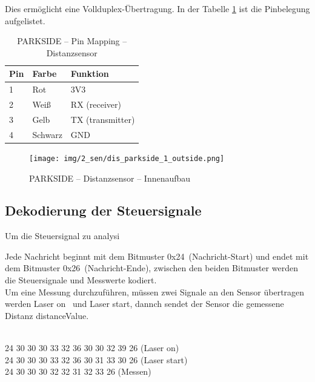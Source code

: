 Dies ermöglicht eine Vollduplex-Übertragung. In der Tabelle \ref{parkside:pinmapping} ist die Pinbelegung aufgelistet.\\



\pagebreak[1]
\begin{table}[ht]
	\centering
	\caption{PARKSIDE – Pin Mapping – Distanzsensor}
	\label{parkside:pinmapping}
	\begin{tabular}{l|ll}
		\hline
		\textbf{Pin} & \textbf{Farbe} & \textbf{Funktion} \\ \hline
		1            & Rot            & 3V3               \\
		2            & Weiß           & RX (receiver)     \\
		3            & Gelb           & TX (transmitter)  \\
		4            & Schwarz        & GND               \\ \hline
	\end{tabular}
\end{table}
\pagebreak[1]

\pagebreak[1]
\begin{figure}[ht]
	\begin{center}
		\texttt{[image: img/2\_sen/dis\_parkside\_1\_outside.png]}
		\caption{PARKSIDE – Distanzsensor – Innenaufbau}
		\label{img_2_2:sen_dis_parkside:1}
	\end{center}
\end{figure}
\pagebreak[4]

\subsection{Dekodierung der Steuersignale}
\label{Distanzmessung:Kodierung}
Um die Steuersignal zu analysi





Jede Nachricht beginnt mit dem Bitmuster \frqq 0x24\flqq\ (Nachricht-Start) und endet mit dem Bitmuster \frqq 0x26\flqq\ (Nachricht-Ende), zwischen den beiden Bitmuster werden die Steuersignale und Messwerte kodiert.\\
Um eine Messung durchzuführen, müssen zwei Signale an den Sensor übertragen werden \frqq Laser on \flqq\ und \frqq Laser start\flqq, dannch sendet der Sensor die gemessene Distanz \frqq distanceValue\flqq.\\
\\
\begin{center}
	24 30 30 30 33 32 36 30 30 32 39 26 (Laser on)\\
	24 30 30 30 33 32 36 30 31 33 30 26 (Laser start)\\
	24 30 30 30 32 32 31 32 33 26 (Messen)\\
\end{center}

